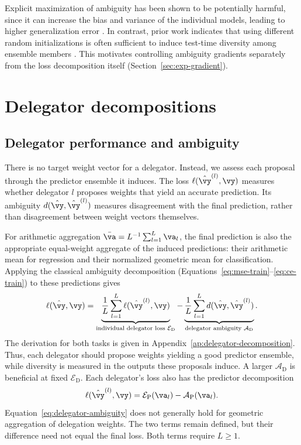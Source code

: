 \documentclass[10pt]{article} %
\newcommand{\dambiguity}{\mathcal{A}_{\mathrm{D}}}
\newcommand{\pambiguity}{\mathcal{A}_{\mathrm{P}}}
\newcommand{\pperformance}{\mathcal{E}_{\mathrm{P}}}
\newcommand{\dperformance}{\mathcal{E}_{\mathrm{D}}}
\begin{document}
Explicit maximization of ambiguity has been shown to be potentially harmful, since it can increase the bias and variance of the individual models, leading to higher generalization error \citep{pmlr-v151-ortega22a, wood2023unified}. In contrast, prior work indicates that using different random initializations is often sufficient to induce test-time diversity among ensemble members \citep{fort2019deep, pmlr-v151-ortega22a}. This motivates controlling ambiguity gradients separately from the loss decomposition itself (Section~\ref{sec:exp-gradient}).

\section{Delegator decompositions}\label{sec:delegator-decompositions} 

\subsection{Delegator performance and ambiguity}\label{sec:delegator-ambiguity}

There is no target weight vector for a delegator. Instead, we assess each proposal through the predictor ensemble it induces. The loss $\ell(\hat{\vy}^{(l)},\vy)$ measures whether delegator $l$ proposes weights that yield an accurate prediction. Its ambiguity $d(\hat{\vy},\hat{\vy}^{(l)})$ measures disagreement with the final prediction, rather than disagreement between weight vectors themselves.

For arithmetic aggregation $\bar{\va}=L^{-1}\sum_{l=1}^L\va_l$, the final prediction is also the appropriate equal-weight aggregate of the induced predictions: their arithmetic mean for regression and their normalized geometric mean for classification. Applying the classical ambiguity decomposition (Equations~\ref{eq:mse-train}--\ref{eq:ce-train}) to these predictions gives
\begin{equation}\label{eq:delegator-ambiguity}
    \ell(\hat{\vy},\vy)
    = \underbrace{\frac{1}{L}\sum_{l=1}^L\ell(\hat{\vy}^{(l)},\vy)}
        _{\text{individual delegator loss }\dperformance}
      -\underbrace{\frac{1}{L}\sum_{l=1}^L d(\hat{\vy},\hat{\vy}^{(l)})}
        _{\text{delegator ambiguity }\dambiguity}.
\end{equation}
The derivation for both tasks is given in Appendix~\ref{ap:delegator-decomposition}.
Thus, each delegator should propose weights yielding a good predictor ensemble, while diversity is measured in the outputs these proposals induce. A larger $\dambiguity$ is beneficial at fixed $\dperformance$. Each delegator's loss also has the predictor decomposition
\begin{equation}\label{eq:delegator-terms}
    \ell(\hat{\vy}^{(l)},\vy)
    = \pperformance(\va_l)-\pambiguity(\va_l).
\end{equation}
Equation~\ref{eq:delegator-ambiguity} does not generally hold for geometric aggregation of delegation weights. The two terms remain defined, but their difference need not equal the final loss. Both terms require $L\geq 1$.
\end{document}
